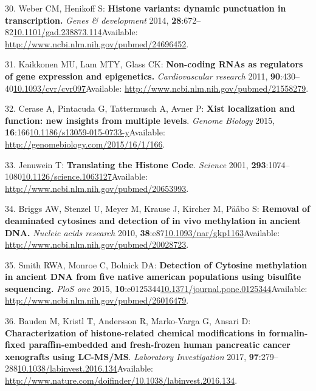 \documentclass[
]{book}
\begin{document}
\leavevmode\hypertarget{ref-Weber2014}{}%
30. Weber CM, Henikoff S: \textbf{Histone variants: dynamic punctuation in transcription.} \emph{Genes \& development} 2014, \textbf{28}:672--82\href{https://doi.org/10.1101/gad.238873.114}{10.1101/gad.238873.114}Available: \url{http://www.ncbi.nlm.nih.gov/pubmed/24696452}.

\leavevmode\hypertarget{ref-Kaikkonen2011}{}%
31. Kaikkonen MU, Lam MTY, Glass CK: \textbf{Non-coding RNAs as regulators of gene expression and epigenetics.} \emph{Cardiovascular research} 2011, \textbf{90}:430--40\href{https://doi.org/10.1093/cvr/cvr097}{10.1093/cvr/cvr097}Available: \url{http://www.ncbi.nlm.nih.gov/pubmed/21558279}.

\leavevmode\hypertarget{ref-Cerase2015}{}%
32. Cerase A, Pintacuda G, Tattermusch A, Avner P: \textbf{Xist localization and function: new insights from multiple levels}. \emph{Genome Biology} 2015, \textbf{16}:166\href{https://doi.org/10.1186/s13059-015-0733-y}{10.1186/s13059-015-0733-y}Available: \url{http://genomebiology.com/2015/16/1/166}.

\leavevmode\hypertarget{ref-Haluskova2010}{}%
33. Jenuwein T: \textbf{Translating the Histone Code}. \emph{Science} 2001, \textbf{293}:1074--1080\href{https://doi.org/10.1126/science.1063127}{10.1126/science.1063127}Available: \url{http://www.ncbi.nlm.nih.gov/pubmed/20653993}.

\leavevmode\hypertarget{ref-Briggs2010}{}%
34. Briggs AW, Stenzel U, Meyer M, Krause J, Kircher M, Pääbo S: \textbf{Removal of deaminated cytosines and detection of in vivo methylation in ancient DNA.} \emph{Nucleic acids research} 2010, \textbf{38}:e87\href{https://doi.org/10.1093/nar/gkp1163}{10.1093/nar/gkp1163}Available: \url{http://www.ncbi.nlm.nih.gov/pubmed/20028723}.

\leavevmode\hypertarget{ref-Smith2015}{}%
35. Smith RWA, Monroe C, Bolnick DA: \textbf{Detection of Cytosine methylation in ancient DNA from five native american populations using bisulfite sequencing.} \emph{PloS one} 2015, \textbf{10}:e0125344\href{https://doi.org/10.1371/journal.pone.0125344}{10.1371/journal.pone.0125344}Available: \url{http://www.ncbi.nlm.nih.gov/pubmed/26016479}.

\leavevmode\hypertarget{ref-Bauden2017}{}%
36. Bauden M, Kristl T, Andersson R, Marko-Varga G, Ansari D: \textbf{Characterization of histone-related chemical modifications in formalin-fixed paraffin-embedded and fresh-frozen human pancreatic cancer xenografts using LC-MS/MS}. \emph{Laboratory Investigation} 2017, \textbf{97}:279--288\href{https://doi.org/10.1038/labinvest.2016.134}{10.1038/labinvest.2016.134}Available: \url{http://www.nature.com/doifinder/10.1038/labinvest.2016.134}.
\end{document}

